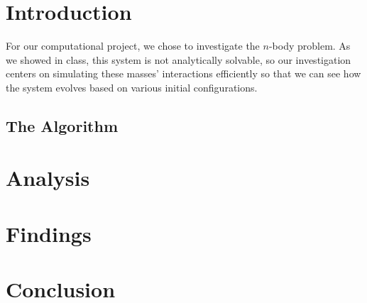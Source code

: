 \documentclass[cm, 10pt]{article}
\begin{document}
  \section{Introduction}
    For our computational project, we chose to investigate the
    $n$-body problem. As we showed in class, this system is not
    analytically solvable, so our investigation centers on simulating
    these masses’ interactions efficiently so that we can see how the
    system evolves based on various initial configurations.

    \subsection{The Algorithm}




  \section{Analysis}


  \section{Findings}


  \section{Conclusion}

\end{document}
